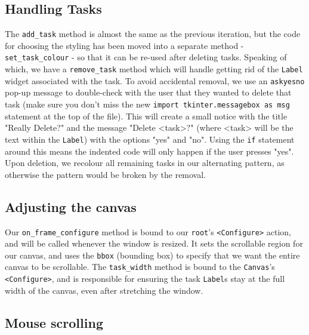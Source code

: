 \documentclass[a4paper,11pt,openany]{book}
\begin{document}
\subsection{Handling Tasks}

The \lstinline[columns=fixed]{add_task} method is almost the same as the previous iteration, but the code for choosing the styling has been moved into a separate method - \lstinline[columns=fixed]{set_task_colour} - so that it can be re-used after deleting tasks. Speaking of which, we have a \lstinline[columns=fixed]{remove_task} method which will handle getting rid of the \lstinline[columns=fixed]{Label} widget associated with the task. To avoid accidental removal, we use an \lstinline[columns=fixed]{askyesno} pop-up message to double-check with the user that they wanted to delete that task (make sure you don't miss the new \lstinline[columns=fixed]{import tkinter.messagebox as msg} statement at the top of the file). This will create a small notice with the title "Really Delete?" and the message "Delete <task>?" (where <task> will be the text within the \lstinline[columns=fixed]{Label}) with the options "yes" and "no". Using the \lstinline[columns=fixed]{if} statement around this means the indented code will only happen if the user presses "yes". Upon deletion, we recolour all remaining tasks in our alternating pattern, as otherwise the pattern would be broken by the removal.  

\subsection{Adjusting the canvas}

Our \lstinline[columns=fixed]{on_frame_configure} method is bound to our \lstinline[columns=fixed]{root}'s \lstinline[columns=fixed]{<Configure>} action, and will be called whenever the window is resized. It sets the scrollable region for our canvas, and uses the \lstinline[columns=fixed]{bbox} (bounding box) to specify that we want the entire canvas to be scrollable. The \lstinline[columns=fixed]{task_width} method is bound to the \lstinline[columns=fixed]{Canvas}'s \lstinline[columns=fixed]{<Configure>}, and is responsible for ensuring the task \lstinline[columns=fixed]{Label}s stay at the full width of the canvas, even after stretching the window.

\subsection{Mouse scrolling}
\end{document}
